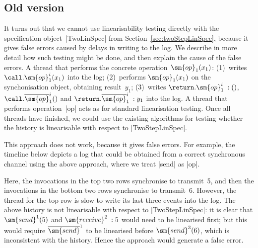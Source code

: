 
\subsection{Old version}

It turns out that we cannot use linearisability testing directly with the
specification object~|TwoLinSpec| from Section~\ref{sec:twoStepLinSpec},
because it gives false errors caused by delays in writing to the log.  We
describe in more detail how such testing might be done, and then explain the
cause of the false errors.  A thread that performs the concrete
operation~$\sm{op}_1(x_1)$: (1)~writes $\call.\sm{op}_1^i(x_1)$ into the log;
(2)~performs $\sm{op}_1(x_1)$ on the synchonisation object, obtaining
result~$y_1$; (3)~writes $\return.\sm{op}_1^i \:: ()$,\,
$\call.\overline{\sm{op}}_1^i()$ and $\return.\overline{\sm{op}}_1^i \:: y_1$
into the log.  A thread that performs operation~|op| acts as for standard
linearisation testing.  Once all threads have finished, we could use the
existing algorithms for testing whether the history is linearisable with
respect to |TwoStepLinSpec|.

This approach does not work, because it gives false errors.  For example, the
timeline below depicts a log that could be obtained from a correct synchronous
channel using the above approach, where we treat |send| as |op|.
%
\begin{center}
\unScalaMid
{}
\scalaMid
\end{center}
%
Here, the invocations in the top two rows synchronise to transmit~5, and then
the invocations in the bottom two rows synchronise to transmit~6.  However,
the thread for the top row is slow to write its last three events into the
log.  The above history is not linearisable with respect to |TwoStepLinSpec|:
it is clear that $\sm{send}^1(5)$ and $\sm{receive}^2 \:: 5$ would need to be
linearised first; but this would require $\overline{\sm{send}}^1$ to be
linearised before $\sm{send}^3(6)$, which is inconsistent with the history.
Hence the approach would generate a false error.


